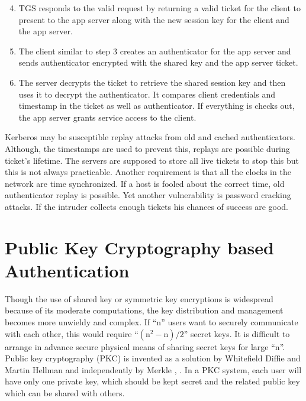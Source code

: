 \begin{multicols}{2}
\begin{enumerate}
\setcounter{enumi}{3}
\item TGS responds to the valid request by returning a valid ticket for the client to present to the app server along with the new session key for the client and the app server.

\item The client similar to step 3 creates an authenticator for the app server and sends authenticator encrypted with the shared key and the app server ticket.

\item The server decrypts the ticket to retrieve the shared session key and then uses it to decrypt the authenticator. It compares client credentials and timestamp in the ticket as well as authenticator. If everything is checks out, the app server grants service access to the client.
\end{enumerate}

Kerberos may be susceptible replay attacks from old and cached authenticators. Although, the timestamps are used to prevent this, replays are possible during ticket's lifetime. The servers are supposed to store all live tickets to stop this but this is not always practicable. Another requirement is that all the clocks in the network are time synchronized. If a host is fooled about the correct time, old authenticator replay is possible. Yet another vulnerability is password cracking attacks. If the intruder collects enough tickets his chances of success are good.

\section*{Public Key Cryptography based Authentication}

Though the use of shared key or symmetric key encryptions is widespread because of its moderate computations, the key distribution and management becomes more unwieldy and complex. If ``n'' users want to securely communicate with each other, this would require ``$(\text{n}^{2}-\text{n})/2$'' secret keys. It is difficult to arrange in advance secure physical means of sharing secret keys for large ``n''. Public key cryptography (PKC) is invented as a solution by Whitefield Diffie and Martin Hellman and independently by Merkle \cite{chap2-key1}, \cite{chap2-key13}. In a PKC system, each user will have only one private key, which should be kept secret and the related public key which can be shared with others.


\end{multicols}
